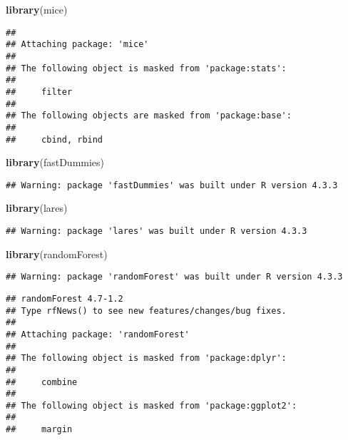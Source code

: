 \documentclass[
]{article}
\newenvironment{Shaded}{\begin{snugshade}}{\end{snugshade}}
\newcommand{\FunctionTok}[1]{\textcolor[rgb]{0.13,0.29,0.53}{\textbf{#1}}}
\newcommand{\NormalTok}[1]{#1}
\begin{document}
\begin{Shaded}
\begin{Highlighting}[]
\FunctionTok{library}\NormalTok{(mice)}
\end{Highlighting}
\end{Shaded}

\begin{verbatim}
## 
## Attaching package: 'mice'
## 
## The following object is masked from 'package:stats':
## 
##     filter
## 
## The following objects are masked from 'package:base':
## 
##     cbind, rbind
\end{verbatim}

\begin{Shaded}
\begin{Highlighting}[]
\FunctionTok{library}\NormalTok{(fastDummies)}
\end{Highlighting}
\end{Shaded}

\begin{verbatim}
## Warning: package 'fastDummies' was built under R version 4.3.3
\end{verbatim}

\begin{Shaded}
\begin{Highlighting}[]
\FunctionTok{library}\NormalTok{(lares)}
\end{Highlighting}
\end{Shaded}

\begin{verbatim}
## Warning: package 'lares' was built under R version 4.3.3
\end{verbatim}

\begin{Shaded}
\begin{Highlighting}[]
\FunctionTok{library}\NormalTok{(randomForest)}
\end{Highlighting}
\end{Shaded}

\begin{verbatim}
## Warning: package 'randomForest' was built under R version 4.3.3
\end{verbatim}

\begin{verbatim}
## randomForest 4.7-1.2
## Type rfNews() to see new features/changes/bug fixes.
## 
## Attaching package: 'randomForest'
## 
## The following object is masked from 'package:dplyr':
## 
##     combine
## 
## The following object is masked from 'package:ggplot2':
## 
##     margin
\end{verbatim}
\end{document}
